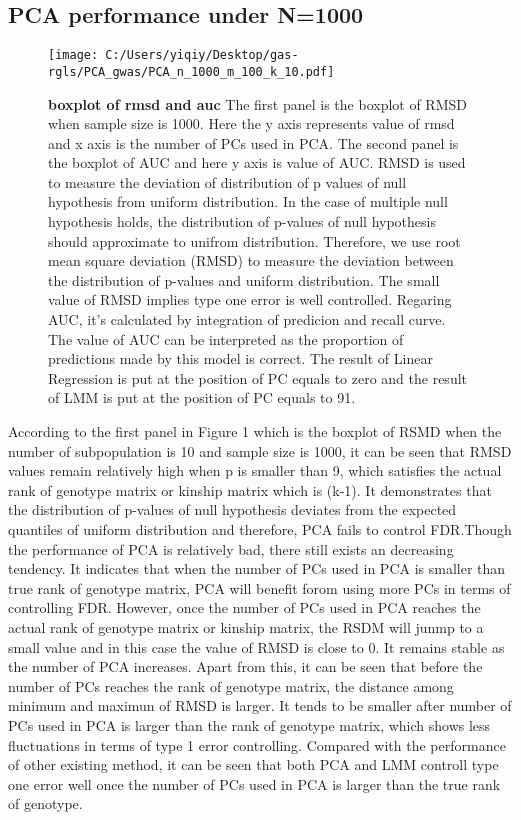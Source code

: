 \documentclass[12pt]{article}
\begin{document}
\subsection{PCA performance under N=1000}
\begin{figure}[bp!]
  \centering
  \texttt{[image: C:/Users/yiqiy/Desktop/gas-rgls/PCA\_gwas/PCA\_n\_1000\_m\_100\_k\_10.pdf]}
  \caption{
    {\bf boxplot of rmsd and auc}
    The first panel is the boxplot of RMSD when sample size is 1000. Here the y axis represents value of rmsd and x axis is the number of PCs used in PCA.
    The second panel is the boxplot of AUC and here y axis is value of AUC. RMSD is used to measure the deviation of distribution of p values of null hypothesis from uniform distribution. In the case of multiple null hypothesis holds, the distribution of p-values of null hypothesis should approximate to unifrom distribution. Therefore, we use root mean square deviation (RMSD) to measure the deviation between the distribution of p-values and uniform distribution. The small value of RMSD implies type one error is well controlled. Regaring AUC, it's calculated by integration of predicion and recall curve. The value of AUC can be interpreted as the proportion of predictions made by this model is correct. The result of Linear Regression is put at the position of PC equals to zero and the result of LMM is put at the position of PC equals to 91.}
  \label{fig:example}
\end{figure}

According to the first panel in Figure 1 which is the boxplot of RSMD when the number of subpopulation is 10 and sample size is 1000, it can be seen that RMSD values remain relatively high when p is smaller than 9, which satisfies the actual rank of genotype matrix or kinship matrix which is (k-1). It demonstrates that the distribution of p-values of null hypothesis deviates from the expected quantiles of uniform distribution and therefore, PCA fails to control FDR.Though the performance of PCA is relatively bad, there still exists an decreasing tendency. It indicates that when the number of PCs used in PCA is smaller than true rank of genotype matrix, PCA will benefit forom using more PCs in terms of controlling FDR. However, once the number of PCs used in PCA reaches the actual rank of genotype matrix or kinship matrix, the RSDM will junmp to a small value and in this case the value of RMSD is close to 0. It remains stable as the number of PCA increases. Apart from this, it can be seen that before the number of PCs reaches the rank of genotype matrix, the distance among minimum and maximun of RMSD is larger. It tends to be smaller after number of PCs used in PCA is larger than the rank of genotype matrix, which shows less fluctuations in terms of type 1 error controlling. Compared with the performance of other existing method, it can be seen that both PCA and LMM controll type one error well once the number of PCs used in PCA is larger than the true rank of genotype.\\
\end{document}
